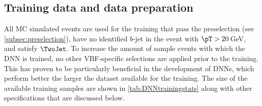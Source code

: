 \subsection{Training data and data preparation}
\label{subsec:training-data}
All MC simulated events are used for the training that pass the preselection (see \cref{subsec:preselection}), have no identified $b$-jet in the event with $\pT > 20\,$GeV, and satisfy $\TwoJet$. To increase the amount of sample events with which the DNN is trained, no other VBF-specific selections are applied prior to the training. This has proven to be particularly beneficial in the development of DNNs, which perform better the larger the dataset available for the training.
The size of the available training samples are shown in \cref{tab:DNNtrainingstats} along with other specifications that are discussed below.
